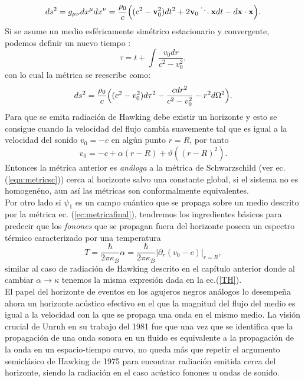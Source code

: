 \begin{align}
ds^2=g_{\mu \nu}dx^{\mu}dx^{\nu}=\frac{\rho_0}{c}\Bigl((c^2-\textbf{v}_0^2)dt^2+2\textbf{v}_0 \ddots \textbf{x}dt-d\textbf{x}\cdot \textbf{x}\Bigr).
\end{align}
Si se asume un medio esf\'{e}ricamente sim\'{e}trico estacionario y convergente, podemos definir un nuevo tiempo \citep{Unruh1981}:
\begin{equation}
\tau=t+\int \frac{v_0dr}{c^2-v_0^2},
\end{equation}
con lo cual la m\'{e}trica se reescribe como:
\begin{equation}\label{ec:metricafinal}
ds^2=\frac{\rho_0}{c}\Bigl((c^2-v_0^2)d\tau^2-\frac{cdr^2}{c^2-v_0^2}-r^2d\Omega^2\Bigr).
\end{equation}
Para que se emita radiaci\'{o}n de Hawking debe existir un horizonte y esto se consigue cuando la velocidad del flujo cambia suavemente tal que es igual a la velocidad del sonido $v_0=-c$ en alg\'{u}n punto $r=R$, por tanto
\begin{equation}
v_0=-c+\alpha(r-R)+\vartheta ((r-R)^2).
\end{equation}
Entonces la métrica anterior es \textit{an\'{a}loga} a la métrica de Schwarzschild (ver ec. (\ref{eqn:metricsc})) cerca al horizonte salvo una constante global, si el sistema no es homogen\'{e}no, aun as\'{i} las m\'{e}tricas son conformalmente equivalentes.\\

Por otro lado si $\psi_1$ es un campo cu\'{a}ntico que se propaga sobre un medio descrito por la m\'{e}trica ec. (\ref{ec:metricafinal}), tendremos los ingredientes b\'{a}sicos para predecir que los \textit{fonones} que se propagan fuera del horizonte poseen un espectro t\'{e}rmico caracterizado por una temperatura
\begin{equation}
T=\frac{\hbar}{2\pi\kappa_B}\alpha=\frac{\hbar}{2\pi\kappa_B}\left|\partial_r(v_0-c)\right|_{r=R},
\end{equation}
similar al caso de radiaci\'{o}n de Hawking descrito en el cap\'{i}tulo anterior donde al cambiar $\alpha\longrightarrow \kappa$ tenemos la misma expresi\'{o}n dada en la ec.(\ref{TH}).\\

El papel del horizonte de eventos en los agujeros negros an\'{a}logos lo desempeña ahora un horizonte acústico efectivo en el que la magnitud del flujo del medio es igual a la velocidad con la que se propaga una onda en el mismo medio. La visión crucial de Unruh en su trabajo del 1981 fue que una vez que se identifica que la propagaci\'{o}n de una onda sonora en un fluido es equivalente a la propagaci\'{o}n de la onda en un espacio-tiempo curvo, no queda m\'{a}s que repetir el argumento semiclásico de Hawking de 1975 para encontrar radiaci\'{o}n emitida cerca del horizonte, siendo la radiaci\'{o}n en el caso ac\'{u}stico fonones u ondas de sonido.


